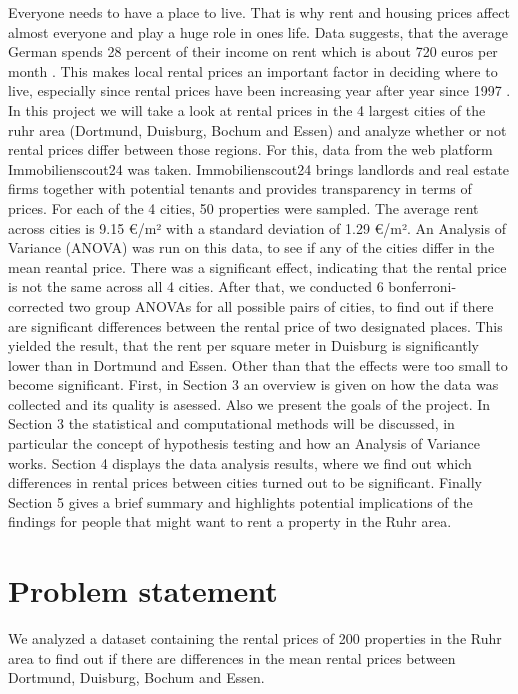 \documentclass[12 pt]{scrartcl}
\begin{document}
Everyone needs to have a place to live. That is why rent and housing prices affect almost everyone and play a huge role in ones life. Data suggests, that the average German spends 28 percent of their income on rent which is about 720 euros per month \citep{statistarent}. This makes local rental prices an important factor in deciding where to live, especially since rental prices have been increasing year after year since 1997 \citep{deutschlandinzahlen}.
In this project we will take a look at rental prices in the 4 largest cities of the ruhr area (Dortmund, Duisburg, Bochum and Essen) and analyze whether or not rental prices differ between those regions. For this, data from the web platform Immobilienscout24 was taken. Immobilienscout24 brings landlords and real estate firms together with potential tenants and provides transparency in terms of prices. For each of the 4 cities, 50 properties were sampled.
The average rent across cities is 9.15 €/m² with a standard deviation of 1.29 €/m².
An Analysis of Variance (ANOVA) was run on this data, to see if any of the cities differ in the mean reantal price. There was a significant effect, indicating that the rental price is not the same across all 4 cities.
After that, we conducted 6 bonferroni-corrected two group ANOVAs for all possible pairs of cities, to find out if there are significant differences between the rental price of two designated places. This yielded the result, that the rent per square meter in Duisburg is significantly lower than in Dortmund and Essen. Other than that the effects were too small to become significant.
First, in Section 3 an overview is given on how the data was collected and its quality is asessed. Also we present the goals of the project. In Section 3 the statistical and computational methods will be discussed, in particular the concept of hypothesis testing and how an Analysis of Variance works.
Section 4 displays the data analysis results, where we find out which differences in rental prices between cities turned out to be significant. Finally Section 5 gives a brief summary and highlights potential implications of the findings for people that might want to rent a property in the Ruhr area.

\section{Problem statement}

We analyzed a dataset containing the rental prices of 200 properties in the Ruhr area to find out if there are differences in the mean rental prices between Dortmund, Duisburg, Bochum and Essen.
\end{document}
